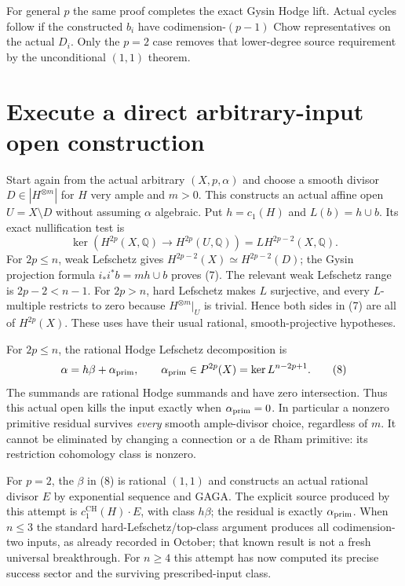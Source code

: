 \documentclass[11pt]{article}
\newcommand{\Q}{\mathbb Q}
\newcommand{\CH}{\operatorname{CH}}
\begin{document}
For general $p$ the same proof completes the exact Gysin Hodge lift.
Actual cycles follow if the constructed $b_i$ have codimension-$(p-1)$
Chow representatives on the actual $D_i$. Only the $p=2$ case removes
that lower-degree source requirement by the unconditional $(1,1)$ theorem.

\section{Execute a direct arbitrary-input open construction}
Start again from the actual arbitrary $(X,p,\alpha)$ and choose a smooth
divisor $D\in|H^{\otimes m}|$ for $H$ very ample and $m>0$.
This constructs an actual affine open $U=X\setminus D$ without
assuming $\alpha$ algebraic. Put $h=c_1(H)$ and $L(b)=h\cup b$.
Its exact nullification test is
\[
 \boxed{\ker(H^{2p}(X,\Q)\to H^{2p}(U,\Q))
                   =L H^{2p-2}(X,\Q).}                 \tag{7}
\]
For $2p\leq n$, weak Lefschetz gives
$H^{2p-2}(X)\simeq H^{2p-2}(D)$; the Gysin projection formula
$i_*i^*b=mh\cup b$ proves (7). The relevant weak Lefschetz range is
$2p-2<n-1$. For $2p>n$, hard Lefschetz makes $L$ surjective, and
every $L$-multiple restricts to zero because $H^{\otimes m}|_U$ is
trivial. Hence both sides in (7) are all of $H^{2p}(X)$.
These uses have their usual rational, smooth-projective hypotheses.

For $2p\leq n$, the rational Hodge Lefschetz decomposition is
\[
 \alpha=h\beta+\alpha_{\rm prim},\qquad
 \alpha_{\rm prim}\in P^{2p}(X)=\ker L^{n-2p+1}.        \tag{8}
\]
The summands are rational Hodge summands and have zero intersection.
Thus this actual open kills the input exactly when
$\alpha_{\rm prim}=0$. In particular a nonzero primitive residual
survives \emph{every} smooth ample-divisor choice, regardless of $m$.
It cannot be eliminated by changing a connection or a de Rham primitive:
its restriction cohomology class is nonzero.

For $p=2$, the $\beta$ in (8) is rational $(1,1)$ and constructs an
actual rational divisor $E$ by exponential sequence and GAGA.
The explicit source produced by this attempt is
$c_1^{\CH}(H)\cdot E$, with class $h\beta$; the residual is exactly
$\alpha_{\rm prim}$. When $n\leq3$ the standard hard-Lefschetz/top-class
argument produces all codimension-two inputs, as already recorded in
October; that known result is not a fresh universal breakthrough.
For $n\geq4$ this attempt has now computed its precise success sector
and the surviving prescribed-input class.
\end{document}
